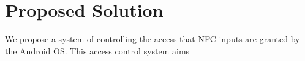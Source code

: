 \documentclass[12pt]{article}
\newcommand\TODO[1]{\textcolor{red}{#1}}
\begin{document}
%
%
%

\section{Proposed Solution}
We propose a system of controlling the access that NFC inputs are granted by the Android OS.
This access control system aims 
\end{document}
